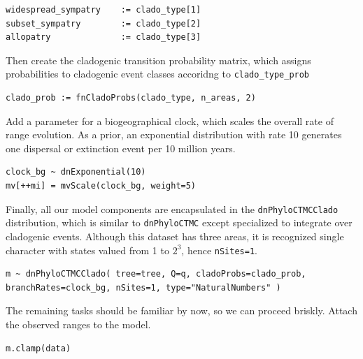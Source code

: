 \begin{snugshade}
\begin{lstlisting}
widespread_sympatry    := clado_type[1]
subset_sympatry        := clado_type[2]
allopatry              := clado_type[3]
\end{lstlisting}
\end{snugshade}

Then create the cladogenic transition probability matrix, which assigns probabilities to cladogenic event classes accoridng to {\tt clado\_type\_prob}

\begin{snugshade}
\begin{lstlisting}
clado_prob := fnCladoProbs(clado_type, n_areas, 2)
\end{lstlisting}
\end{snugshade}

Add a parameter for a biogeographical clock, which scales the overall rate of range evolution.
As a prior, an exponential distribution with rate 10 generates one dispersal or extinction event per 10 million years.

\begin{snugshade}
\begin{lstlisting}
clock_bg ~ dnExponential(10)
mv[++mi] = mvScale(clock_bg, weight=5)
\end{lstlisting}
\end{snugshade}

Finally, all our model components are encapsulated in the {\tt dnPhyloCTMCClado} distribution, which is similar to {\tt dnPhyloCTMC} except specialized to integrate over cladogenic events. Although this dataset has three areas, it is recognized single character with states valued from 1 to $2^3$, hence {\tt nSites=1}.

\begin{snugshade}
\begin{lstlisting}
m ~ dnPhyloCTMCClado( tree=tree, Q=q, cladoProbs=clado_prob, branchRates=clock_bg, nSites=1, type="NaturalNumbers" )
\end{lstlisting}
\end{snugshade}

The remaining tasks should be familiar by now, so we can proceed briskly. Attach the observed ranges to the model.

\begin{snugshade}
\begin{lstlisting}
m.clamp(data)
\end{lstlisting}
\end{snugshade}

